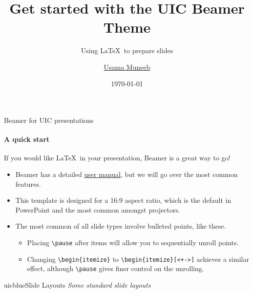 \documentclass{beamer}
\title{Get started with the UIC Beamer Theme}
\subtitle{Using \LaTeX\ to prepare slides}
\author{\href{mailto:umunee2@uic.edu}{Usama Muneeb}}
\date{\today}
\newcommand{\hrefcol}[2]{\textcolor{uihteal}{\href{#1}{#2}}}
\begin{document}
\maketitle
{} %



\begin{frame}[fragile]{Beamer for UIC presentations}
\framesubtitle{A quick start}
If you would like \LaTeX\ in your presentation, Beamer is a great way to go!
\begin{itemize}
\item Beamer has a detailed
\hrefcol{https://www.ctan.org/tex-archive/macros/latex/contrib/beamer/doc/beameruserguide.pdf}{user
 manual}, but we will go over the most common features.
\item This template is designed for a 16:9 aspect ratio, which is the default in PowerPoint and the most common amongst projectors.
\item The most common of all slide types involve bulleted points, like these. \pause
\begin{itemize}
\item Placing \verb|\pause| after items will allow you to sequentially unroll points.
\item Changing \verb|\begin{itemize}| to \verb|\begin{itemize}[<+->]| achieves a similar effect, although \verb|\pause| gives finer control on the unrolling.
\end{itemize}
\end{itemize}
\end{frame}


\begin{chapter}{uicblue}{Slide Layouts}
\textit{Some standard slide layouts}
\end{chapter}
\end{document}
